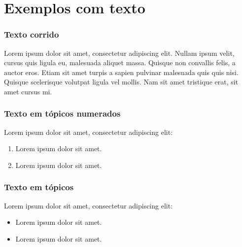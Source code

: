 \section{Exemplos com texto} %


\begin{frame}
	\frametitle{Texto corrido}
    Lorem ipsum dolor sit amet, consectetur adipiscing elit. Nullam ipsum velit, cursus quis ligula eu, malesuada aliquet massa. Quisque non convallis felis, a auctor eros. Etiam sit amet turpis a sapien pulvinar malesuada quis quis nisi. Quisque scelerisque volutpat ligula vel mollis. Nam sit amet tristique erat, sit amet cursus mi. 
\end{frame}


\begin{frame}
	\frametitle{Texto em tópicos numerados}
     Lorem ipsum dolor sit amet, consectetur adipiscing elit:
    \begin{enumerate}
        \item Lorem ipsum dolor sit amet.
        \item Lorem ipsum dolor sit amet.
    \end{enumerate}
	
\end{frame}


\begin{frame}
	\frametitle{Texto em tópicos}
     Lorem ipsum dolor sit amet, consectetur adipiscing elit:
    \begin{itemize}
        \item Lorem ipsum dolor sit amet.
        \item Lorem ipsum dolor sit amet.
    \end{itemize}
	
\end{frame}


